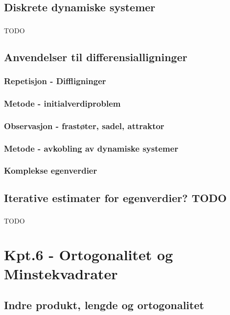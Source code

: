 \documentclass{article}
\begin{document}
    \subsection{Diskrete dynamiske systemer}
      \subsubsection{}
        TODO
    \subsection{Anvendelser til differensialligninger}
      \subsubsection{Repetisjon - Diffligninger}
        
      \subsubsection{Metode - initialverdiproblem}
        
      \subsubsection{Observasjon - frastøter, sadel, attraktor}
        
      \subsubsection{Metode - avkobling av dynamiske systemer}
        
      \subsubsection{Komplekse egenverdier}
        
    \subsection{Iterative estimater for egenverdier? TODO}
      \subsubsection{}
        TODO
  \section{Kpt.6 - Ortogonalitet og Minstekvadrater}
    \subsection{Indre produkt, lengde og ortogonalitet}
\end{document}
